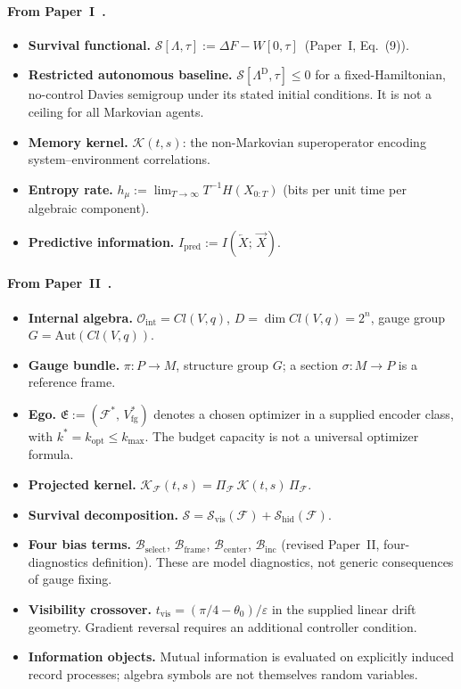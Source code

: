 \documentclass[12pt,a4paper,openany]{book}
\begin{document}
\paragraph{From Paper~I~\cite{Liu2026TDOME_I}.}
\begin{itemize}
\item \textbf{Survival functional.}
  $\mathcal{S}[\Lambda,\tau]
  := \Delta F - W[0,\tau]$~(Paper~I,
  Eq.~(9)).
\item \textbf{Restricted autonomous baseline.}
  $\mathcal{S}[\Lambda^{\mathrm{D}},\tau]\leq0$ for a fixed-Hamiltonian,
  no-control Davies semigroup under its stated initial conditions.  It
  is not a ceiling for all Markovian agents.
\item \textbf{Memory kernel.}
  $\mathcal{K}(t,s)$: the non-Markovian superoperator
  encoding system--environment correlations.
\item \textbf{Entropy rate.}
  $h_\mu := \lim_{T\to\infty}T^{-1}H(X_{0:T})$ (bits per
  unit time per algebraic component).
\item \textbf{Predictive information.}
  $I_{\mathrm{pred}}
  := I(\overleftarrow{X};\,\overrightarrow{X})$.
\end{itemize}

\paragraph{From Paper~II~\cite{Liu2026TDOME_II}.}
\begin{itemize}
\item \textbf{Internal algebra.}
  $\mathcal{O}_{\mathrm{int}} = Cl(V,q)$, $D = \dim Cl(V,q) = 2^n$,
  gauge group $G = \mathrm{Aut}(Cl(V,q))$.
\item \textbf{Gauge bundle.}
  $\pi: P \to M$, structure group $G$; a section
  $\sigma: M \to P$ is a reference frame.
\item \textbf{Ego.}
  $\mathfrak{E} := (\mathcal{F}^*,\,V_{\mathrm{fg}}^*)$
  denotes a chosen optimizer in a supplied encoder class, with
  $k^*=k_{\mathrm{opt}}\leq k_{\max}$.  The budget capacity is not a
  universal optimizer formula.
\item \textbf{Projected kernel.}
  $\mathcal{K}_{\mathcal{F}}(t,s)
  = \Pi_{\mathcal{F}}\,\mathcal{K}(t,s)\,
  \Pi_{\mathcal{F}}$.
\item \textbf{Survival decomposition.}
  $\mathcal{S} = \mathcal{S}_{\mathrm{vis}}(\mathcal{F})
  + \mathcal{S}_{\mathrm{hid}}(\mathcal{F})$.
\item \textbf{Four bias terms.}
  $\mathcal{B}_{\mathrm{select}}$,
  $\mathcal{B}_{\mathrm{frame}}$,
  $\mathcal{B}_{\mathrm{center}}$,
  $\mathcal{B}_{\mathrm{inc}}$
  (revised Paper~II, four-diagnostics definition).  These are model
  diagnostics, not generic consequences of gauge fixing.
\item \textbf{Visibility crossover.}
  $t_{\mathrm{vis}}=(\pi/4-\theta_0)/\varepsilon$ in the supplied
  linear drift geometry.  Gradient reversal requires an additional
  controller condition.
\item \textbf{Information objects.}
  Mutual information is evaluated on explicitly induced record
  processes; algebra symbols are not themselves random variables.
\end{itemize}
\end{document}
